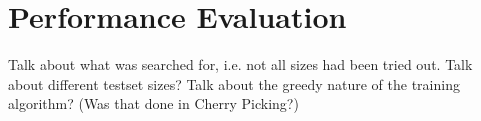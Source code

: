 \section{Performance Evaluation}


Talk about what was searched for, i.e. not all sizes had been tried out.
Talk about different testset sizes?
Talk about the greedy nature of the training algorithm? (Was that done in Cherry Picking?)










